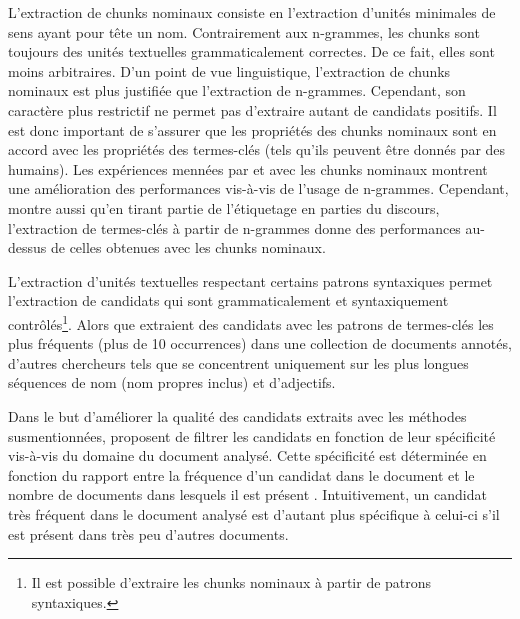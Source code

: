       L'extraction de chunks nominaux consiste en l'extraction d'unités
      minimales de sens ayant pour tête un nom. Contrairement aux n-grammes, les
      chunks sont toujours des unités textuelles grammaticalement correctes. De
      ce fait, elles sont moins arbitraires. D'un point de vue linguistique,
      l'extraction de chunks nominaux est plus justifiée que l'extraction de
      n-grammes. Cependant, son caractère plus restrictif ne permet pas
      d'extraire autant de candidats positifs. Il est donc important de
      s'assurer que les propriétés des chunks nominaux sont en accord avec les
      propriétés des termes-clés (tels qu'ils peuvent être donnés par des
      humains). Les expériences mennées par 
      et  avec les chunks nominaux montrent une
      amélioration des performances vis-à-vis de l'usage de n-grammes.
      Cependant,  montre aussi qu'en tirant
      partie de l'étiquetage en parties du discours, l'extraction de termes-clés
      à partir de n-grammes donne des performances au-dessus de celles obtenues
      avec les chunks nominaux.

      L'extraction d'unités textuelles respectant certains patrons syntaxiques
      permet l'extraction de candidats qui sont grammaticalement et
      syntaxiquement contrôlés\footnote{Il est possible d'extraire les
      chunks nominaux à partir de patrons syntaxiques.}. Alors que
       extraient des candidats avec les
      patrons de termes-clés les plus fréquents (plus de 10 occurrences) dans
      une collection de documents annotés, d'autres chercheurs tels que
       se concentrent uniquement sur les plus longues
      séquences de nom (nom propres inclus) et d'adjectifs.

      Dans le but d'améliorer la qualité des candidats extraits avec les
      méthodes susmentionnées,  proposent de
      filtrer les candidats en fonction de leur spécificité vis-à-vis du domaine
      du document analysé. Cette spécificité est déterminée en fonction du
      rapport entre la fréquence d'un candidat dans le document et le nombre de
      documents dans lesquels il est présent \cite[TF-IDF]{jones1972tfidf}.
      Intuitivement, un candidat très fréquent dans le document analysé est
      d'autant plus spécifique à celui-ci s'il est présent dans très peu
      d'autres documents.

